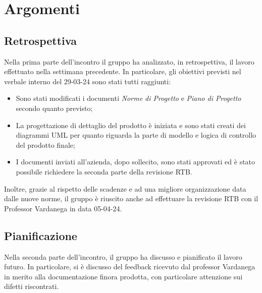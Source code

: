 \section{Argomenti}
\subsection{Retrospettiva}
Nella prima parte dell'incontro il gruppo ha analizzato, in retrospettiva, il lavoro effettuato nella settimana precedente.
In particolare, gli obiettivi previsti nel verbale interno del 29-03-24 sono stati tutti raggiunti:
\begin{itemize}
    \item Sono stati modificati i documenti \textit{Norme di Progetto} e \textit{Piano di Progetto} secondo quanto previsto;
    \item La progettazione di dettaglio del prodotto è iniziata e sono stati creati dei diagrammi UML per quanto riguarda la parte di modello e logica di controllo del prodotto finale;
    \item  I documenti inviati all'azienda, dopo sollecito, sono stati approvati ed è stato possibile richiedere la seconda parte della revisione RTB.
\end{itemize}
Inoltre, grazie al rispetto delle scadenze e ad una migliore organizzazione data dalle nuove norme, il gruppo è riuscito anche ad effettuare la revisione RTB con il Professor Vardanega in data 05-04-24. 


\subsection{Pianificazione}
\noindent Nella seconda parte dell'incontro, il gruppo ha discusso e pianificato il lavoro futuro. In particolare, si è discusso del feedback ricevuto dal professor Vardanega in merito alla documentazione finora prodotta, con particolare attenzione sui difetti riscontrati.
\bigskip


